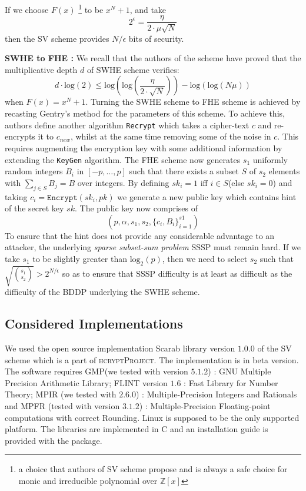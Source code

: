\documentclass{acm_proc_article-sp}
\begin{document}
If we choose $F(x)$ \footnote{a choice that authors of SV scheme propose and is always a safe choice for monic and irreducible polynomial over $\mathbb{Z}[x] $} to be $x^N+1$, and take \begin{equation}2 ^ \epsilon = \frac{\eta}{2\cdot \mu \sqrt{N}} \end{equation} then the SV scheme provides $N /\epsilon$ bits of security.

\textbf{SWHE to FHE :} We recall that the authors of the scheme have proved that the multiplicative depth $d$ of SWHE scheme verifies: \begin{equation}d \cdot \mathrm{log}(2) \leq  \mathrm{log}\left( \mathrm{log}\left(\frac{\eta}{2\cdot \sqrt{N}}\right) \right) - \mathrm{log}\left(\mathrm{log}\left( N\mu\right)\right)\end{equation}
when $F(x)= x^N+1$. Turning the SWHE scheme to FHE scheme is achieved by recasting Gentry's method for the parameters of this scheme. To achieve this, authors define another algorithm \texttt{Recrypt} which takes a cipher-text $c$ and re-encrypts it to $c_{new}$, whilst at the same time removing some of the noise in $c$. This requires augmenting the encryption key with some additional information by extending the \texttt{KeyGen} algorithm. The FHE scheme now generates $s_1$ uniformly random integers $B_i$ in $[-p, \ldots, p]$ such that there exists a subset $S$ of $s_2$ elements with $\sum_{j \in S}{B_j}= B$ over integers. By defining $sk_i =1$ iff $i\in S$(else $sk_i=0$) and taking $c_i=\texttt{Encrypt}(sk_i,pk)$ we generate a new public key which contains hint of the secret key $sk$. The public key now comprises of \[(p, \alpha, s_1, s_2, \{c_i, B_i\}_{i=1}^{s1})\]
To ensure that the hint does not provide any considerable advantage to an attacker, the underlying \textit{sparse subset-sum problem} SSSP must remain hard. If we take $s_1$ to be slightly greater than $\mathrm{log}_{2}(p)$, then we need to select $s_2$ such that $\sqrt {{s_1}  \choose {s_2} } > 2 ^{N/\epsilon}$ so as to ensure that SSSP difficulty is at least as difficult as the difficulty of the BDDP underlying the SWHE scheme. 

\subsection{Considered Implementations}
We used the open source implementation Scarab library \cite{hcrypt}  version $1.0.0$ of the SV scheme which is a part of \textsc{hcryptProject}. The implementation is in beta version. The software requires GMP(we tested with version $5.1.2$) \cite{gmp} : GNU Multiple Precision Arithmetic Library; FLINT version $1.6$ \cite{flint}: Fast Library for Number Theory; MPIR (we tested with $2.6.0$) \cite{mpir} : Multiple-Precision Integers and Rationals and MPFR (tested with version $3.1.2$) \cite{mpfr} :  Multiple-Precision Floating-point computations with correct Rounding. Linux is supposed to be the only supported platform. The libraries are implemented in  C and an installation guide is provided with the package. 
\end{document}
